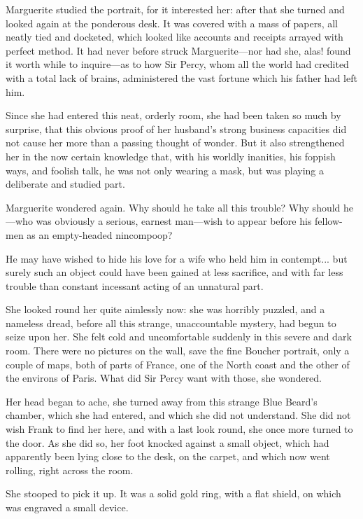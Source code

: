 \documentclass[paper=5.5in:8.5in,BCOR=7mm,twoside,DIV=calc,12pt,usegeometry,chapterprefix,endperiod,headings=big]{scrbook}
\begin{document}
Marguerite studied the portrait, for it interested her: after that she turned and looked again at the ponderous desk. It was covered with a mass of papers, all neatly tied and docketed, which looked like accounts and receipts arrayed with perfect method. It had never before struck Marguerite---nor had she, alas! found it worth while to inquire---as to how Sir Percy, whom all the world had credited with a total lack of brains, administered the vast fortune which his father had left him.

Since she had entered this neat, orderly room, she had been taken so much by surprise, that this obvious proof of her husband's strong business capacities did not cause her more than a passing thought of wonder. But it also strengthened her in the now certain knowledge that, with his worldly inanities, his foppish ways, and foolish talk, he was not only wearing a mask, but was playing a deliberate and studied part.

Marguerite wondered again. Why should he take all this trouble? Why should he---who was obviously a serious, earnest man---wish to appear before his fellow-men as an empty-headed nincompoop?

He may have wished to hide his love for a wife who held him in contempt... but surely such an object could have been gained at less sacrifice, and with far less trouble than constant incessant acting of an unnatural part.

She looked round her quite aimlessly now: she was horribly puzzled, and a nameless dread, before all this strange, unaccountable mystery, had begun to seize upon her. She felt cold and uncomfortable suddenly in this severe and dark room. There were no pictures on the wall, save the fine Boucher portrait, only a couple of maps, both of parts of France, one of the North coast and the other of the environs of Paris. What did Sir Percy want with those, she wondered.

Her head began to ache, she turned away from this strange Blue Beard's chamber, which she had entered, and which she did not understand. She did not wish Frank to find her here, and with a last look round, she once more turned to the door. As she did so, her foot knocked against a small object, which had apparently been lying close to the desk, on the carpet, and which now went rolling, right across the room.

She stooped to pick it up. It was a solid gold ring, with a flat shield, on which was engraved a small device.
\end{document}
